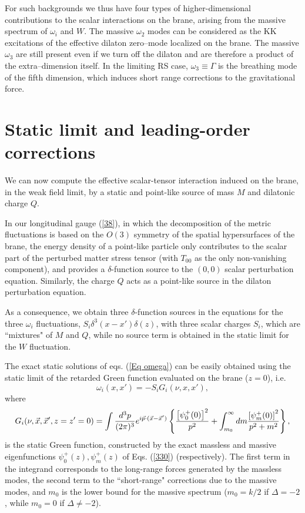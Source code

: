 \documentclass[a4paper,12pt]{article}
\begin{document}
For such backgrounds we  thus have four types of
higher-dimensional contributions to the scalar interactions on the
brane, arising from the massive spectrum of $\omega_i$ and $W$.
The massive $\omega_2$ modes can be considered as the KK
excitations of the effective dilaton zero--mode localized on the
brane. The massive $\omega_3$ are still present even if we turn
off the dilaton and are therefore a product of the
extra--dimension itself. In the limiting RS case, $\omega_3\equiv
\Gamma$ is the breathing mode of the fifth dimension, which
induces short range corrections to the gravitational force.

\section{Static limit and leading-order corrections}

We can now compute the effective scalar-tensor interaction
induced on the brane, in the weak field limit, by a static and
point-like source of mass $M$ and dilatonic charge $Q$.

In our longitudinal gauge (\ref{38}), in which the decomposition
of the metric fluctuations is based on the $O(3)$ symmetry of the
spatial hypersurfaces of the brane, the energy density of a
point-like particle only contributes to the scalar part of the
perturbed matter stress tensor (with $T_{00}$ as the only
non-vanishing component), and provides a $\delta$-function source
to the $(0,0)$ scalar perturbation equation. Similarly, the charge
$Q$ acts as a point-like source in the dilaton perturbation
equation.

As a  consequence, we obtain three $\delta$-function sources in
the equations for the three $\omega_i$ fluctuations, $S_i
\delta^3(x-x')\delta(z)$, with three scalar charges $S_i$, which
are ``mixtures"  of $M$ and $Q$, while no source term is obtained
in the static limit for the $W$ fluctuation.

The exact static solutions of eqs. (\ref{Eq omega}) can be easily
obtained using the static limit of the retarded Green function
evaluated on the brane ($z=0$), i.e.
\begin{equation} \omega_i(x,x')= -S_i G_i (\nu,x,x'), \label{62}
\end{equation}
where
\begin{equation}
G_i (\nu,\vec x, \vec x', z=z'=0)= \int {d^3p\over (2 \pi)^3} e^{i
\vec p \cdot (\vec x -\vec
x')}\left\{{\left[\psi^+_{0}(0)\right]^2\over p^2}
+\int_{m_0}^\infty dm {\left[\psi^+_{m}(0)\right]^2\over p^2+m^2}
\right\},
 \label{63}
\end{equation}
is the static Green function, constructed by the exact massless
and massive eigenfunctions $\psi^+_{0}(z), \psi^+_{m}(z)$ of Eqs.
(\ref{330}) (respectively). The first term in the integrand
corresponds to the long-range forces generated by the massless
modes, the second term to the ``short-range" corrections due to
the massive modes, and $m_0$ is the lower bound for the massive
spectrum ($m_0=k/2$ if $\Delta=-2$, while $m_0=0$ if $\Delta \neq
-2 $).
\end{document}
